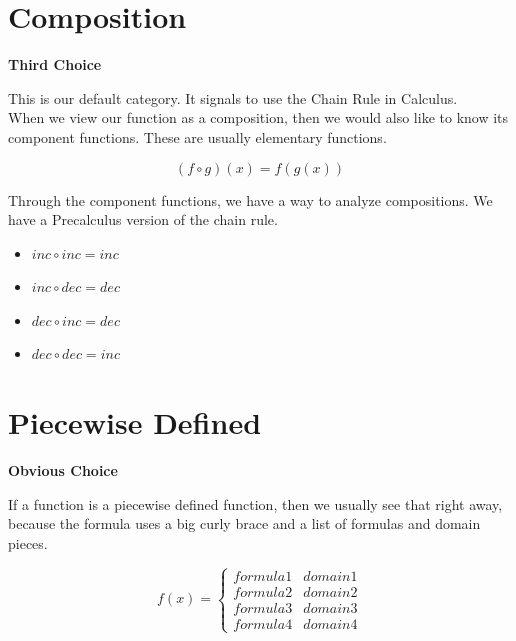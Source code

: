 \documentclass{ximera}
\begin{document}
\section*{Composition}


\textbf{\textcolor{purple!85!blue}{Third Choice}} 

This is our default category.  It signals to use the Chain Rule in Calculus. \\


When we view our function as a composition, then we would also like to know its component functions. These are usually elementary functions. 



\[
(f \circ g)(x) = f(g(x))
\]



Through the component functions, we have a way to analyze compositions.  We have a Precalculus version of the chain rule.


\begin{itemize}
\item  $inc \circ inc = inc$
\item  $inc \circ dec = dec$
\item  $dec \circ inc = dec$
\item  $dec \circ dec = inc$
\end{itemize}













\section*{Piecewise Defined}


\textbf{\textcolor{purple!85!blue}{Obvious Choice}} 

If a function is a piecewise defined function, then we usually see that right away, because the formula uses a big curly brace and a list of formulas and domain pieces.




\[
f(x) = 
\begin{cases}
  formula 1 & domain 1  \\
  formula 2 & domain 2  \\
  formula 3 & domain 3  \\
  formula 4 & domain 4  
\end{cases}
\]
\end{document}
